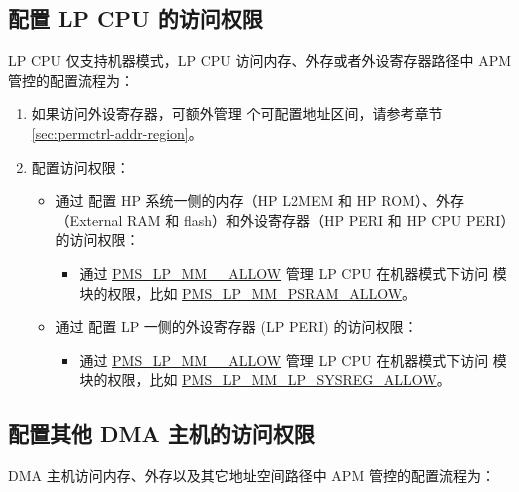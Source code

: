 \documentclass[main\_\_CN.tex]{subfiles}
\begin{document}
\subsection{配置 LP CPU 的访问权限}

LP CPU 仅支持机器模式，LP CPU 访问内存、外存或者外设寄存器路径中 APM 管控的配置流程为：

\begin{enumerate}
    \item 如果访问外设寄存器，可额外管理  个可配置地址区间，请参考章节 \ref{sec:permctrl-addr-region}。
    \item 配置访问权限：
    \begin{itemize}
        \item 通过  配置 HP 系统一侧的内存（HP L2MEM 和 HP ROM）、外存（External RAM 和 flash）和外设寄存器（HP PERI 和 HP CPU PERI）的访问权限：
        \begin{itemize}
            \item 通过 \hyperref[fielddesc:PMSLPMML2ROMALLOW]{PMS\_LP\_MM\_\_ALLOW} 管理 LP CPU 在机器模式下访问  模块的权限，比如 \hyperref[fielddesc:PMSLPMMPSRAMALLOW]{PMS\_LP\_MM\_PSRAM\_ALLOW}。
        \end{itemize}
        \item 通过  配置 LP 一侧的外设寄存器 (LP PERI) 的访问权限：
        \begin{itemize}
            \item 通过 \hyperref[fielddesc:PMSLPMMLPSYSREGALLOW]{PMS\_LP\_MM\_\_ALLOW} 管理 LP CPU 在机器模式下访问  模块的权限，比如 \hyperref[fielddesc:PMSLPMMLPSYSREGALLOW]{PMS\_LP\_MM\_LP\_SYSREG\_ALLOW}。
        \end{itemize}
    \end{itemize}
\end{enumerate}

\subsection{配置其他 DMA 主机的访问权限}

DMA 主机访问内存、外存以及其它地址空间路径中 APM 管控的配置流程为：
\end{document}
